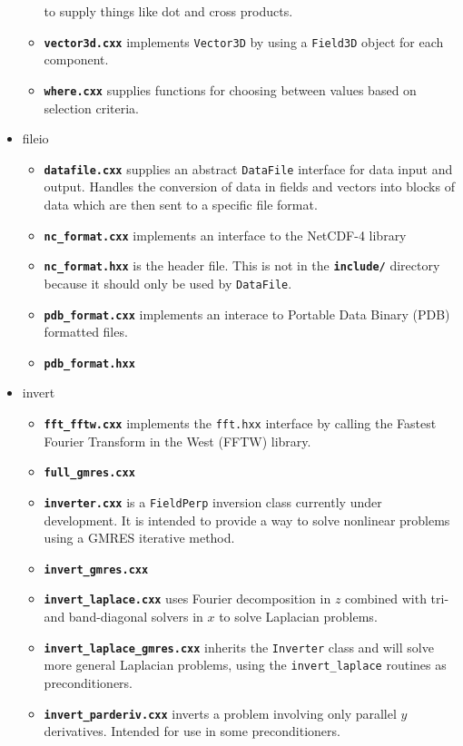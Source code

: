 \documentclass[12pt]{article}
\newcommand{\code}[1]{\texttt{#1}}
\newcommand{\file}[1]{\texttt{\bf #1}}
\begin{document}
\begin{itemize}
\begin{itemize}
    to supply things like dot and cross products.
  \item \file{vector3d.cxx} implements \code{Vector3D} by using a
    \code{Field3D} object for each component.
  \item \file{where.cxx} supplies functions for choosing between values
    based on selection criteria.
  \end{itemize}
\item fileio
  \begin{itemize}
  \item \file{datafile.cxx} supplies an abstract \code{DataFile} interface
    for data input and output. Handles the conversion of data in fields
    and vectors into blocks of data which are then sent to a specific file
    format.
  \item \file{nc\_format.cxx} implements an interface to the NetCDF-4 library
  \item \file{nc\_format.hxx} is the header file. This is not in the
    \file{include/} directory because it should only be used by \code{DataFile}.
  \item \file{pdb\_format.cxx} implements an interace to Portable Data
    Binary (PDB) formatted files.
  \item \file{pdb\_format.hxx}
  \end{itemize}
\item invert
  \begin{itemize}
  \item \file{fft\_fftw.cxx} implements the \code{fft.hxx} interface by calling
    the Fastest Fourier Transform in the West (FFTW) library.
  \item \file{full\_gmres.cxx}
  \item \file{inverter.cxx} is a \code{FieldPerp} inversion class currently
    under development. It is intended to provide a way to solve nonlinear
    problems using a GMRES iterative method.
  \item \file{invert\_gmres.cxx}
  \item \file{invert\_laplace.cxx} uses Fourier decomposition in $z$ combined
    with tri- and band-diagonal solvers in $x$ to solve Laplacian problems.
  \item \file{invert\_laplace\_gmres.cxx} inherits the \code{Inverter} class
    and will solve more general Laplacian problems, using the
    \code{invert\_laplace} routines as preconditioners.
  \item \file{invert\_parderiv.cxx} inverts a problem involving only parallel
    $y$ derivatives. Intended for use in some preconditioners.

\end{itemize}
\end{itemize}
\end{document}
